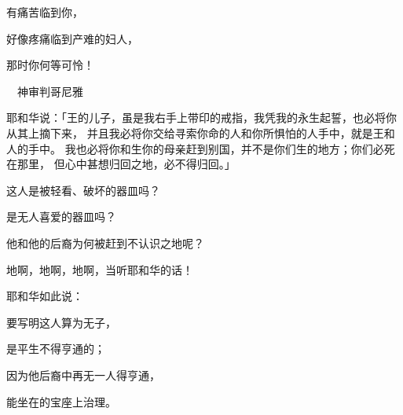 {\par }{\Q 有痛苦临到你，
\par }{\Q 好像疼痛临到产难的妇人，
\par }{\Q 那时你何等可怜！
\par }{\SH 　神审判哥尼雅
\par }{\PP {}耶和华说：「{}王{}的儿子{}，虽是我右手上带印的戒指，我凭我的永生起誓，也必将你从其上摘下来，
并且我必将你交给寻索你命的人和你所惧怕的人手中，就是{}王{}和{}人的手中。
我也必将你和生你的母亲赶到别国，并不是你们生的地方；你们必死在那里，
但心中甚想归回之地，必不得归回。」
\par }{\Q {}这人是被轻看、破坏的器皿吗？
\par }{\Q 是无人喜爱的器皿吗？
\par }{\Q 他和他的后裔为何被赶到不认识之地呢？
\par }{\Q {}地啊，地啊，地啊，当听耶和华的话！
\par }{\Q {}耶和华如此说：
\par }{\Q 要写明这人算为无子，
\par }{\Q 是平生不得亨通的；
\par }{\Q 因为他后裔中再无一人得亨通，
\par }{\Q 能坐在{}的宝座上治理{}。

}
